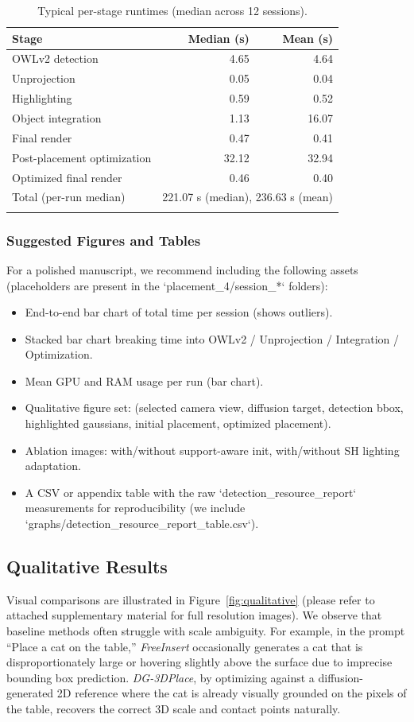 \documentclass[pdflatex,sn-mathphys-num]{sn-jnl}%
\theoremstyle{thmstyleone}%
\theoremstyle{thmstyletwo}%
\theoremstyle{thmstylethree}%
\begin{document}
\begin{table}[h]
\caption{Typical per-stage runtimes (median across 12 sessions).}\label{tab:timing}
\begin{tabular}{@{}lrr@{}}
\toprule
Stage & Median (s) & Mean (s) \\
\midrule
OWLv2 detection & 4.65 & 4.64 \\
Unprojection & 0.05 & 0.04 \\
Highlighting & 0.59 & 0.52 \\
Object integration & 1.13 & 16.07 \\
Final render & 0.47 & 0.41 \\
Post-placement optimization & 32.12 & 32.94 \\
Optimized final render & 0.46 & 0.40 \\
\midrule
Total (per-run median) & \multicolumn{2}{r}{221.07 s (median), 236.63 s (mean)} \\
\botrule
\end{tabular}
\end{table}

\subsubsection{Suggested Figures and Tables}
For a polished manuscript, we recommend including the following assets (placeholders are present in the `placement_4/session_*` folders):
\begin{itemize}
  \item End-to-end bar chart of total time per session (shows outliers).
  \item Stacked bar chart breaking time into OWLv2 / Unprojection / Integration / Optimization.
  \item Mean GPU and RAM usage per run (bar chart).
  \item Qualitative figure set: (selected camera view, diffusion target, detection bbox, highlighted gaussians, initial placement, optimized placement).
  \item Ablation images: with/without support-aware init, with/without SH lighting adaptation.
  \item A CSV or appendix table with the raw `detection_resource_report` measurements for reproducibility (we include `graphs/detection_resource_report_table.csv`).
\end{itemize}

\subsection{Qualitative Results}
Visual comparisons are illustrated in Figure~\ref{fig:qualitative} (please refer to attached supplementary material for full resolution images). We observe that baseline methods often struggle with scale ambiguity. For example, in the prompt ``Place a cat on the table,'' \textit{FreeInsert} occasionally generates a cat that is disproportionately large or hovering slightly above the surface due to imprecise bounding box prediction. \textit{DG-3DPlace}, by optimizing against a diffusion-generated 2D reference where the cat is already visually grounded on the pixels of the table, recovers the correct 3D scale and contact points naturally.
\end{document}
